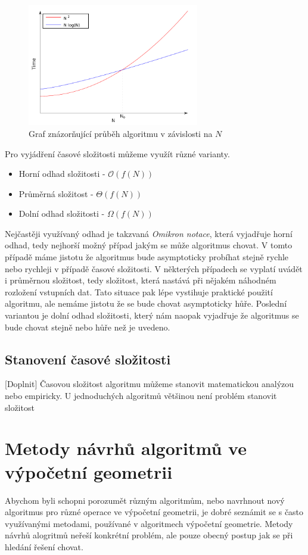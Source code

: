 \begin{figure}[h]
  \centering
  \includegraphics[width=7.5cm]{./pictures/3/time_complexity.pdf}
  \caption{Graf znázorňující průběh algoritmu v závislosti na $N$}
  \label{fig:3-time_complexity}
\end{figure}
	
	 Pro vyjádření časové složitosti můžeme využít různé varianty.
\begin{itemize}
	\item Horní odhad složitosti - $\mathcal{O} (f(N))$
	\item Průměrná složitost - $\Theta (f(N))$
	\item Dolní odhad složitosti - $\Omega (f(N))$
\end{itemize}	
	Nejčastěji využívaný odhad je takzvaná \textit{Omikron notace}, která vyjadřuje horní odhad, tedy nejhorší možný případ jakým se může algoritmus chovat. V tomto případě máme jistotu že algoritmus bude asymptoticky probíhat stejně rychle nebo rychleji v případě časové složitosti. V některých případech se vyplatí uvádět i průměrnou složitost, tedy složitost, která nastává při nějakém náhodném rozložení vstupních dat. Tato situace pak lépe vystihuje praktické použití algoritmu, ale nemáme jistotu že se bude chovat asymptoticky hůře. Poslední variantou je dolní odhad složitosti, který nám naopak vyjadřuje že algoritmus se bude chovat stejně nebo hůře než je uvedeno.
	
\subsection{Stanovení časové složitosti}
	[Doplnit] Časovou složitost algoritmu můžeme stanovit matematickou analýzou nebo empiricky. U jednoduchých algoritmů většinou není problém stanovit složitost

\section{Metody návrhů algoritmů ve výpočetní geometrii}
	Abychom byli schopni porozumět různým algoritmům, nebo navrhnout nový algoritmus pro různé operace ve výpočetní geometrii, je dobré seznámit se s často využívanými metodami, používané v algoritmech výpočetní geometrie. Metody návrhů alogritmů neřeší konkrétní problém, ale pouze obecný postup jak se při hledání řešení chovat.

